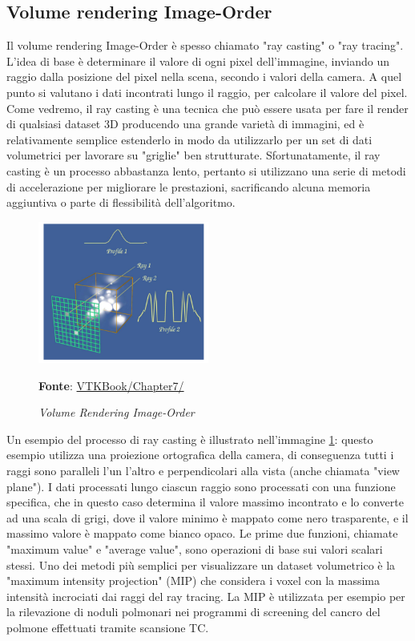 \subsection{Volume rendering Image-Order}\label{sec:volume-image-order}
Il volume rendering Image-Order è spesso chiamato "ray casting" o "ray tracing". L'idea di base è determinare il valore di ogni pixel dell'immagine, inviando un raggio dalla posizione del pixel nella scena, secondo i valori della camera. A quel punto si  valutano i dati incontrati lungo il raggio, per calcolare il valore del pixel. Come vedremo, il ray casting è una tecnica che può essere usata per fare il render di qualsiasi dataset 3D producendo una grande varietà di immagini, ed è relativamente semplice estenderlo in modo da utilizzarlo per un set di dati volumetrici per lavorare su "griglie" ben strutturate. Sfortunatamente, il ray casting è un processo abbastanza lento, pertanto si utilizzano una serie di metodi di accelerazione per migliorare le prestazioni, sacrificando alcuna memoria aggiuntiva o parte di flessibilità dell'algoritmo.

\begin{figure}[h]
    \centering
    \includegraphics[width=0.5\textwidth]{immagini/volumerendering/imageorder.png}
    \caption{\textit{Volume Rendering Image-Order}}
    \textbf{Fonte}: \href{https://lorensen.github.io/VTKExamples/site/VTKBook/07Chapter7/}{VTKBook/Chapter7/}
    \label{fig: Volume Rendering Image-Order}
\end{figure}

Un esempio del processo di ray casting è illustrato nell'immagine \ref{fig: Volume Rendering Image-Order}: questo esempio utilizza una proiezione ortografica della camera, di conseguenza tutti i raggi sono paralleli l'un l'altro e perpendicolari alla vista (anche chiamata "view plane").
I dati processati lungo ciascun raggio sono processati con una funzione specifica, che in questo caso determina il valore massimo incontrato e lo converte ad una scala di grigi, dove il valore minimo è mappato come nero trasparente, e il massimo valore è mappato come bianco opaco. Le prime due funzioni, chiamate "maximum value" e "average value", sono operazioni di base sui valori scalari stessi. Uno dei metodi più semplici per visualizzare un dataset volumetrico è la "maximum intensity projection" (MIP) che considera i voxel con la massima intensità incrociati dai raggi del ray tracing. La MIP è utilizzata per esempio per la rilevazione di noduli polmonari nei programmi di screening del cancro del polmone effettuati tramite scansione TC.

